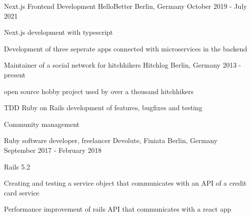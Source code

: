 

\begin{cventries}
  \cventry
    {Next.js Frontend Development} %
    {HelloBetter} %
    {Berlin, Germany} %
    {October 2019 - July 2021} %
    {
      \begin{cvitems} %
        \item {Next.js development with typescript}
        \item {Development of three seperate apps connected with microservices in the backend}
      \end{cvitems}
    }

  \cventry
    {Maintainer of a social network for hitchhikers} %
    {Hitchlog} %
    {Berlin, Germany} %
    {2013 - present} %
    {
      \begin{cvitems} %
        \item {open source hobby project used by over a thousand hitchhikers}
        \item {TDD Ruby on Rails development of features, bugfixes and testing}
        \item {Community management}
      \end{cvitems}
    }

  \cventry
    {Ruby software developer, freelancer} %
    {Devolute, Finiata} %
    {Berlin, Germany} %
    {September 2017 - February 2018} %
    {
      \begin{cvitems} %
        \item { Rails 5.2 }
        \item { Creating and testing a service object that communicates with an API of a credit card service }
        \item { Performance improvement of rails API that communicates with a react app }
      \end{cvitems}
    }


\end{cventries}
